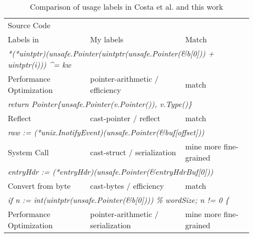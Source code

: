 \begin{table}[h]
    \centering
    \caption{Comparison of \unsafe{} usage labels in Costa et al. and this work}
    \label{tbl:costa-labels-comparison}
    \begin{tabularx}{\textwidth}{X|l|l}
        \toprule
        \multicolumn{3}{l}{Source Code} \\
        Labels in~\cite{costa2020} & My labels                           & Match \\
        \midrule
        \multicolumn{3}{l}{\textit{*(*uintptr)(unsafe.Pointer(uintptr(unsafe.Pointer(\&b[0])) + uintptr(i))) \^{}= kw}} \\
        Performance Optimization   & pointer-arithmetic / efficiency     & match  \\ \hline
        \multicolumn{3}{l}{\textit{return Pointer\{unsafe.Pointer(v.Pointer()), v.Type()\}}} \\
        Reflect                    & cast-pointer / reflect              & match  \\ \hline
        \multicolumn{3}{l}{\textit{raw := (*unix.InotifyEvent)(unsafe.Pointer(\&buf[offset]))}} \\
        System Call                & cast-struct / serialization         & mine more fine-grained \\ \hline
        \multicolumn{3}{l}{\textit{entryHdr := (*entryHdr)(unsafe.Pointer(\&entryHdrBuf[0]))}} \\
        Convert from byte          & cast-bytes / efficiency             & match  \\ \hline
        \multicolumn{3}{l}{\textit{if n := int(uintptr(unsafe.Pointer(\&b[0]))) \% wordSize; n != 0 \{}} \\
        Performance Optimization   & pointer-arithmetic / serialization  & mine more fine-grained \\
        \bottomrule
    \end{tabularx}
\end{table}